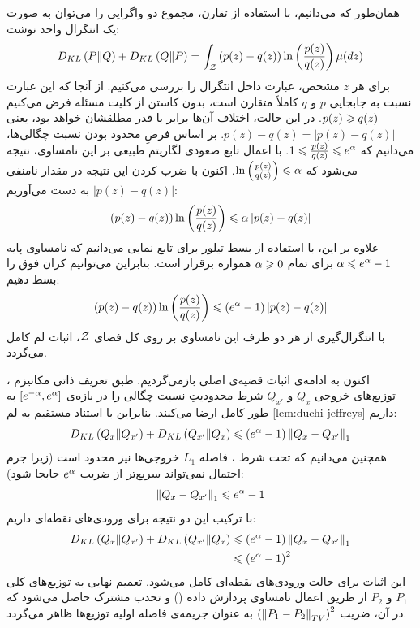 \begin{اثبات}
\begin{اثبات}
همان‌طور که می‌دانیم، با استفاده از تقارن، مجموع دو واگرایی را می‌توان به صورت یک انتگرال واحد نوشت:
\begin{equation}
D_{KL}\left(P \| Q\right) + D_{KL}\left(Q \| P\right) = \int_{\Zset} \left( p(z) - q(z) \right) \ln\left( \frac{p(z)}{q(z)} \right) \mu(dz)
\end{equation}
برای هر $z$ مشخص، عبارت داخل انتگرال را بررسی می‌کنیم. از آنجا که این عبارت نسبت به جابجایی $p$ و $q$ کاملاً متقارن است، بدون کاستن از کلیت مسئله فرض می‌کنیم $p(z) \geqslant q(z)$. در این حالت، اختلاف آن‌ها برابر با قدر مطلقشان خواهد بود، یعنی $p(z) - q(z) = \left| p(z) - q(z) \right|$.
بر اساس فرضِ محدود بودن نسبت چگالی‌ها، می‌دانیم که $1 \leqslant \frac{p(z)}{q(z)} \leqslant e^{\alpha}$. با اعمال تابع صعودی لگاریتم طبیعی بر این نامساوی، نتیجه می‌شود که $\ln\left(\frac{p(z)}{q(z)}\right) \leqslant \alpha$. 
اکنون با ضرب کردن این نتیجه در مقدار نامنفی $\left| p(z) - q(z) \right|$ به دست می‌آوریم:
\begin{equation}
\left( p(z) - q(z) \right) \ln\left( \frac{p(z)}{q(z)} \right) \leqslant \alpha \left| p(z) - q(z) \right|
\end{equation}
علاوه بر این، با استفاده از بسط تیلور برای تابع نمایی می‌دانیم که نامساوی پایه $\alpha \leqslant e^{\alpha} - 1$ برای تمام $\alpha \geqslant 0$ همواره برقرار است. بنابراین می‌توانیم کران فوق را بسط دهیم:
\begin{equation}
\left( p(z) - q(z) \right) \ln\left( \frac{p(z)}{q(z)} \right) \leqslant \left(e^{\alpha} - 1\right) \left| p(z) - q(z) \right|
\end{equation}
با انتگرال‌گیری از هر دو طرف این نامساوی بر روی کل فضای $\Zset$، اثبات لم کامل می‌گردد.
\end{اثبات}

اکنون به ادامه‌ی اثبات قضیه‌ی اصلی بازمی‌گردیم. طبق تعریف ذاتی مکانیزم \LDP، توزیع‌های خروجی $Q_x$ و $Q_{x'}$ شرط محدودیتِ نسبت چگالی را در بازه‌ی $\left[e^{-\alpha}, e^{\alpha}\right]$ به طور کامل ارضا می‌کنند. بنابراین با استناد مستقیم به لم \ref{lem:duchi-jeffreys} داریم:
\begin{equation}
D_{KL}\left(Q_x \| Q_{x'}\right) + D_{KL}\left(Q_{x'} \| Q_x\right) \leqslant \left(e^{\alpha} - 1\right) \left\lVert Q_x - Q_{x'}\right\rVert_1
\end{equation}
همچنین می‌دانیم که تحت شرط \LDP، فاصله $L_1$ خروجی‌ها نیز محدود است (زیرا جرم احتمال نمی‌تواند سریع‌تر از ضریب $e^{\alpha}$ جابجا شود):
\begin{equation}
\left\lVert Q_x - Q_{x'}\right\rVert_1 \leqslant e^{\alpha} - 1
\end{equation}
با ترکیب این دو نتیجه برای ورودی‌های نقطه‌ای داریم:
\begin{align}
D_{KL}\left(Q_x \| Q_{x'}\right) + D_{KL}\left(Q_{x'} \| Q_x\right) &\leqslant \left(e^{\alpha} - 1\right) \left\lVert Q_x - Q_{x'}\right\rVert_1 \nonumber \\
&\leqslant \left(e^{\alpha} - 1\right)^2
\end{align}
این اثبات برای حالت ورودی‌های نقطه‌ای کامل می‌شود. تعمیم نهایی به توزیع‌های کلی $P_1$ و $P_2$ از طریق اعمال نامساوی پردازش داده () و تحدب مشترک حاصل می‌شود که در آن، ضریب $\left(\left\lVert P_1 - P_2\right\rVert_{TV}\right)^2$ به عنوان جریمه‌ی فاصله اولیه توزیع‌ها ظاهر می‌گردد.
\end{اثبات}


